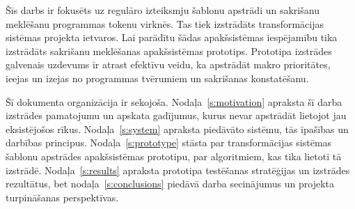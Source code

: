 Šīs darbs ir fokusēts uz regulāro izteiksmju šablonu apstrādi un sakrišanu meklēšanu programmas tokenu virknēs. Tas tiek izstrādāts transformācijas sistēmas projekta ietvaros. Lai parādītu šādas apakšsistēmas iespējamību tika izstrādāts sakrišanu meklēšanas apakšsistēmas prototips. Prototipa izstrādes galvenais uzdevums ir atrast efektīvu veidu, ka apstrādāt makro prioritātes, ieejas un izejas no programmas tvērumiem un sakrišanas konstatēšanu.

Šī dokumenta organizācija ir sekojoša. Nodaļa~\ref{s:motivation} apraksta šī darba izstrādes pamatojumu un apskata gadījumus, kurus nevar apstrādāt lietojot jau eksistējošos rīkus. Nodaļa~\ref{s:system} apraksta piedāvāto sistēmu, tās īpašības un darbības principus. Nodaļa~\ref{s:prototype} stāsta par transformācijas sistēmas šablonu apstrādes apakšsistēmas prototipu, par algoritmiem, kas tika lietoti tā izstrādē. Nodaļa~\ref{s:results} apraksta prototipa testēšanas stratēģijas un izstrādes rezultātus, bet nodaļa~\ref{s:conclusions} piedāvā darba secinājumus un projekta turpināšanas perspektīvas.